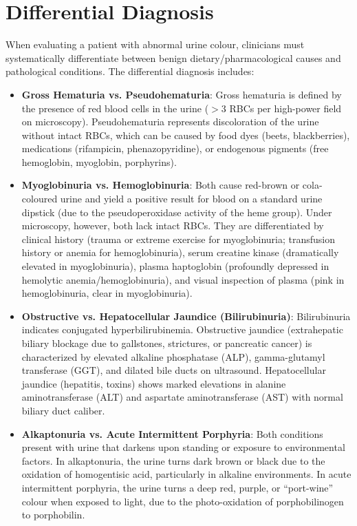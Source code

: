 \section*{Differential Diagnosis}
When evaluating a patient with abnormal urine colour, clinicians must systematically differentiate between benign dietary/pharmacological causes and pathological conditions. The differential diagnosis includes:

\begin{itemize}
  \item \textbf{Gross Hematuria vs. Pseudohematuria}: Gross hematuria is defined by the presence of red blood cells in the urine ($>3$ RBCs per high-power field on microscopy). Pseudohematuria represents discoloration of the urine without intact RBCs, which can be caused by food dyes (beets, blackberries), medications (rifampicin, phenazopyridine), or endogenous pigments (free hemoglobin, myoglobin, porphyrins).

  \item \textbf{Myoglobinuria vs. Hemoglobinuria}: Both cause red-brown or cola-coloured urine and yield a positive result for blood on a standard urine dipstick (due to the pseudoperoxidase activity of the heme group). Under microscopy, however, both lack intact RBCs. They are differentiated by clinical history (trauma or extreme exercise for myoglobinuria; transfusion history or anemia for hemoglobinuria), serum creatine kinase (dramatically elevated in myoglobinuria), plasma haptoglobin (profoundly depressed in hemolytic anemia/hemoglobinuria), and visual inspection of plasma (pink in hemoglobinuria, clear in myoglobinuria).

  \item \textbf{Obstructive vs. Hepatocellular Jaundice (Bilirubinuria)}: Bilirubinuria indicates conjugated hyperbilirubinemia. Obstructive jaundice (extrahepatic biliary blockage due to gallstones, strictures, or pancreatic cancer) is characterized by elevated alkaline phosphatase (ALP), gamma-glutamyl transferase (GGT), and dilated bile ducts on ultrasound. Hepatocellular jaundice (hepatitis, toxins) shows marked elevations in alanine aminotransferase (ALT) and aspartate aminotransferase (AST) with normal biliary duct caliber.

  \item \textbf{Alkaptonuria vs. Acute Intermittent Porphyria}: Both conditions present with urine that darkens upon standing or exposure to environmental factors. In alkaptonuria, the urine turns dark brown or black due to the oxidation of homogentisic acid, particularly in alkaline environments. In acute intermittent porphyria, the urine turns a deep red, purple, or ``port-wine'' colour when exposed to light, due to the photo-oxidation of porphobilinogen to porphobilin.


\end{itemize}
